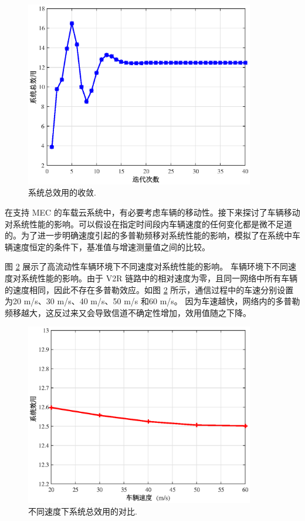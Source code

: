 \begin{figure}[H]
\centering
\includegraphics[width=10cm]{figures//chap3//ee.eps}
\caption{系统总效用的收敛.}
\label{F4}
\end{figure}

在支持 MEC 的车载云系统中，有必要考虑车辆的移动性。接下来探讨了车辆移动对系统性能的影响。可以假设在指定时间段内车辆速度的任何变化都是微不足道的。为了进一步明确速度引起的多普勒频移对系统性能的影响，模拟了在系统中车辆速度恒定的条件下，基准值与增速测量值之间的比较。

图 \ref{F5} 展示了高流动性车辆环境下不同速度对系统性能的影响。
车辆环境下不同速度对系统性能的影响。由于 V2R 链路中的相对速度为零，且同一网络中所有车辆的速度相同，因此不存在多普勒效应。如图 \ref{F5} 所示，通信过程中的车速分别设置为20 m/s、30 m/s、40 m/s、50 m/s 和60 m/s。 因为车速越快，网络内的多普勒频移越大，这反过来又会导致信道不确定性增加，效用值随之下降。
\begin{figure}[H]
\centering
\includegraphics[width=10cm]{figures//chap3//diffspeed1.eps}
\caption{不同速度下系统总效用的对比.}
\label{F5}
\end{figure}

